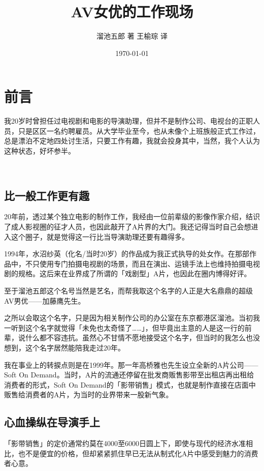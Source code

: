 \documentclass[12pt,UTF8]{ctexbook}
\title{\heiti\zihao{0} AV女优的工作现场}
\author{溜池五郎 著 王榆琮 译}
\date{\today}
\begin{document}
\maketitle
\tableofcontents

\frontmatter
\chapter{前言}

我20岁时曾担任过电视剧和电影的导演助理，但并不是制作公司、电视台的正职人员，只是区区一名约聘雇员。从大学毕业至今，也从未像个上班族般正式工作过，总是漂泊不定地四处讨生活，只要工作有趣，我就会投身其中，当然，我个人认为这种状态，好坏参半。

~\\

\section{比一般工作更有趣}

20年前，透过某个独立电影的制作工作，我经由一位前辈级的影像作家介绍，结识了成人影视圈的征才人员，也因此敲开了A片界的大门。我还记得当时自己会想进入这个圈子，就是觉得这一行比当导演助理还要有趣得多。

1994年，水沼纱英（化名/当时20岁）的作品成为我正式执导的处女作。在那部作品中，不只使用专门拍摄电视剧的场景，而且在演出、运镜手法上也维持拍摄电视剧的规格。这后来在业界成了所谓的「戏剧型」A片，也因此在圈内博得好评。

至于溜池五郎这个名号当然是艺名，而帮我取这个名字的人正是大名鼎鼎的超级AV男优——加藤鹰先生。

之所以会取这个名字，只是因为相关制作公司的办公室在东京都港区溜池。当初我一听到这个名字就觉得「未免也太奇怪了……」，但毕竟出主意的人是这一行的前辈，说什么都不容违抗。虽然心不甘情不愿地接受这个名字，但当时的我怎么也没想到，这个名字居然能陪我走过20年。

我在事业上的转捩点则是在1999年。那一年高桥雅也先生设立全新的A片公司——Soft On Demand。当时，A片的流通还停留在批发商贩售影带至出租店再出租给消费者的形式，Soft On Demand的「影带销售」模式，也就是制作直接在店面中贩售给消费者的A片，为当时的业界带来一股新气象。

\section{心血操纵在导演手上}

「影带销售」的定价通常约莫在4000至6000日圆上下，即使与现代的经济水准相比，也不是便宜的价格，但却紧紧抓住早已无法从制式化A片中感受到魅力的消费者心意。
\end{document}
